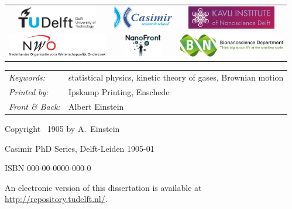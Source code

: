 \begin{titlepage}
\vfill
\begin{center}
\begin{tabular}{ccc}
    \includegraphics[height=0.4in]{title/logos/tudelft} &
    \includegraphics[height=0.4in]{title/logos/casimir}  &
    \includegraphics[height=0.4in]{title/logos/Logo_Kavli_institute} 
    \\
    \smallskip
    \includegraphics[height=0.4in]{title/logos/nwo} &
    \includegraphics[height=0.4in]{title/logos/Nanofront_logo} &    
    \includegraphics[height=0.4in]{title/logos/BN_logo}
\end{tabular}
\end{center}
\vfill

\noindent
\begin{tabular}{@{}p{}@{}p{}}
    \textit{Keywords:} & statistical physics, kinetic theory of gases, Brownian motion
     \\[\medskipamount]
    \textit{Printed by:} & Ipskamp Printing, Enschede \\[\medskipamount]
    \textit{Front \& Back:} & Albert Einstein
\end{tabular}

\vspace{3\bigskipamount}

\noindent Copyright \textcopyright\ 1905 by A.~Einstein

\medskip
\noindent Casimir PhD Series, Delft-Leiden 1905-01

\medskip
\noindent ISBN 000-00-0000-000-0

\medskip
\noindent An electronic version of this dissertation is available at \\
\url{http://repository.tudelft.nl/}.

\end{titlepage}